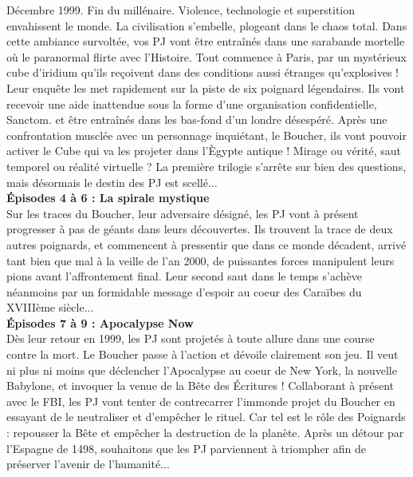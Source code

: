 \documentclass[11pt,twoside,a4paper]{book}
\begin{document}
D{\'e}cembre 1999. Fin du mill{\'e}naire. Violence, technologie et superstition envahissent le monde. La civilisation s'embelle, plogeant dans le chaos total. Dans cette ambiance survolt{\'e}e, vos PJ vont {\^e}tre entra{\^i}n{\'e}s dans une sarabande mortelle o{\`u} le paranormal flirte avec l'Histoire. Tout commence {\`a} Paris, par un myst{\'e}rieux cube d'iridium qu'ils re\c{c}oivent dans des conditions aussi {\'e}tranges qu'explosives ! Leur enqu{\^e}te les met rapidement sur la piste de six poignard l{\'e}gendaires. Ils vont recevoir une aide inattendue sous la forme d'une organisation confidentielle, Sanctom. et {\^e}tre entra{\^i}n{\'e}s dans les bas-fond d'un londre d{\'e}sesp{\'e}r{\'e}. Apr{\`e}s une confrontation muscl{\'e}e avec un personnage inqui{\'e}tant, le Boucher, ils vont pouvoir activer le Cube qui va les projeter dans l'{\`E}gypte antique ! Mirage ou v{\'e}rit{\'e}, saut temporel ou r{\'e}alit{\'e} virtuelle ? La premi{\`e}re trilogie s'arr{\^e}te sur bien des questions, mais d{\'e}sormais le destin des PJ est scell{\'e}... ~\\

\textbf{\large {\'E}pisodes 4 {\`a} 6 : La spirale mystique}~\\

Sur les traces du Boucher, leur adversaire d{\'e}sign{\'e}, les PJ vont {\`a} pr{\'e}sent progresser {\`a} pas de g{\'e}ants dans leurs d{\'e}couvertes. Ils trouvent la trace de deux autres poignards, et commencent {\`a} pressentir que dans ce monde d{\'e}cadent, arriv{\'e} tant bien que mal {\`a} la veille de l'an 2000, de puissantes forces manipulent leurs pions avant l'affrontement final. Leur second saut dans le temps s'ach{\`e}ve n{\'e}anmoins par un formidable message d'espoir au coeur des Cara{\"i}bes du XVIII{\`e}me si{\`e}cle... ~\\

\textbf{\large {\'E}pisodes 7 {\`a} 9 : Apocalypse Now}~\\

D{\`e}s leur retour en 1999, les PJ sont projet{\'e}s {\`a} toute allure dans une course contre la mort. Le Boucher passe {\`a} l'action et d{\'e}voile clairement son jeu. Il veut ni plus ni moins que d{\'e}clencher l'Apocalypse au coeur de New York, la nouvelle Babylone, et invoquer la venue de la B{\^e}te des {\'E}critures ! Collaborant {\`a} pr{\'e}sent avec le FBI, les PJ vont tenter de contrecarrer l'immonde projet du Boucher en essayant de le neutraliser et d'emp{\^e}cher le rituel. Car tel est le r{\^o}le des Poignards : repousser la B{\^e}te et emp{\^e}cher la destruction de la plan{\`e}te. Apr{\`e}s un d{\'e}tour par l'Espagne de 1498, souhaitons que les PJ parviennent {\`a} triompher afin de pr{\'e}server l'avenir de l'humanit{\'e}... ~\\
\end{document}
